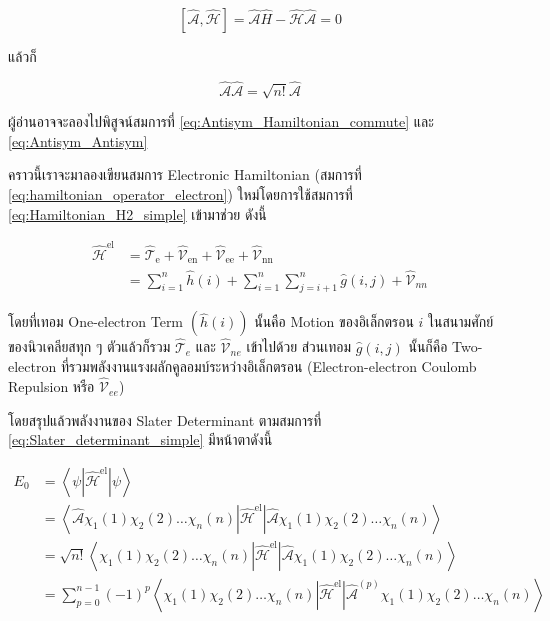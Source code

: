 \begin{equation}
    \label{eq:Antisym_Hamiltonian_commute}
    [\hat{\mathscr{A}}, \hat{\mathscr{H}}] 
    = \hat{\mathscr{A}} \hat{H}-\hat{\mathscr{H}} \hat{\mathscr{A}} 
    = 0
\end{equation}

\noindent แล้วก็

\begin{equation}
    \label{eq:Antisym_Antisym}
    \hat{\mathscr{A}} \hat{\mathscr{A}} = \sqrt{n !} \hat{\mathscr{A}}
\end{equation}

\noindent ผู้อ่านอาจจะลองไปพิสูจน์สมการที่ \ref{eq:Antisym_Hamiltonian_commute} และ \ref{eq:Antisym_Antisym}

คราวนี้เราจะมาลองเขียนสมการ Electronic Hamiltonian (สมการที่ \ref{eq:hamiltonian_operator_electron}) 
ใหม่โดยการใช้สมการที่ \ref{eq:Hamiltonian_H2_simple} เข้ามาช่วย ดังนี้

\begin{equation}
    \begin{aligned}
        \hat{\mathscr{H}}^{\text{el}}
        & = \hat{\mathscr{T}}_{\text{e}}
        + \hat{\mathscr{V}}_{\text{en}}
        + \hat{\mathscr{V}}_{\text{ee}}
        + \hat{\mathscr{V}}_{\text{nn}} \\
        & = \sum_{i=1}^{n} \hat{h}(i)
        + \sum_{i=1}^{n} \sum_{j=i+1}^{n} \hat{g}(i,j) + \hat{\mathscr{V}}_{nn}
    \end{aligned}
\end{equation}

\noindent โดยที่เทอม One-electron Term $(\hat{h}(i))$ นั้นคือ Motion ของอิเล็กตรอน $i$ ในสนามศักย์ของนิวเคลียสทุก ๆ 
ตัวแล้วก็รวม $\hat{\mathscr{T}}_e$ และ $\hat{\mathscr{V}}_{n e}$ เข้าไปด้วย ส่วนเทอม $\hat{g}(i, j)$ นั้นก็คือ Two-electron 
ที่รวมพลังงานแรงผลักคูลอมบ์ระหว่างอิเล็กตรอน (Electron-electron Coulomb Repulsion หรือ $\hat{\mathscr{V}}_{e e}$) 

โดยสรุปแล้วพลังงานของ Slater Determinant ตามสมการที่ \ref{eq:Slater_determinant_simple} มีหน้าตาดังนี้

\begin{equation}
    \label{eq:energy_Slater_determinant}
    \begin{aligned}
        E_0 
        & = \left\langle\psi\left|\hat{\mathscr{H}}^{\mathrm{el}}\right| \psi\right\rangle \\
        & = \left\langle\hat{\mathscr{A}} \chi_1(1) \chi_2(2) \dots \chi_n(n)
            \left|\hat{\mathscr{H}}^{\mathrm{el}}\right| 
            \hat{\mathscr{A}} \chi_1(1) \chi_2(2) \dots \chi_n(n)\right\rangle \\
        & = \sqrt{n !}\left\langle\chi_1(1) \chi_2(2) \dots \chi_n(n)
            \left|\hat{\mathscr{H}}^{\mathrm{el}}\right| 
            \hat{\mathscr{A}} \chi_1(1) \chi_2(2) \dots \chi_n(n)\right\rangle \\
        & = \sum_{p=0}^{n-1}(-1)^p\left\langle\chi_1(1) \chi_2(2) \dots \chi_n(n)
            \left|\hat{\mathscr{H}}^{\mathrm{el}}\right| 
            \hat{\mathscr{A}}^{(p)} \chi_1(1) \chi_2(2) \dots \chi_n(n)\right\rangle
    \end{aligned}
\end{equation}

